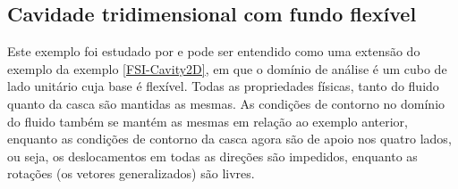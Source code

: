 


\subsection{Cavidade tridimensional com fundo flexível}

Este exemplo foi estudado por  e pode ser entendido como uma extensão do exemplo da exemplo \ref{FSI-Cavity2D}, em que o domínio de análise é um cubo de lado unitário cuja base é flexível. Todas as propriedades físicas, tanto do fluido quanto da casca são mantidas as mesmas. As condições de contorno no domínio do fluido também se mantém as mesmas em relação ao exemplo anterior, enquanto as condições de contorno da casca agora são de apoio nos quatro lados, ou seja, os deslocamentos em todas as direções são impedidos, enquanto as rotações (os vetores generalizados) são livres.

